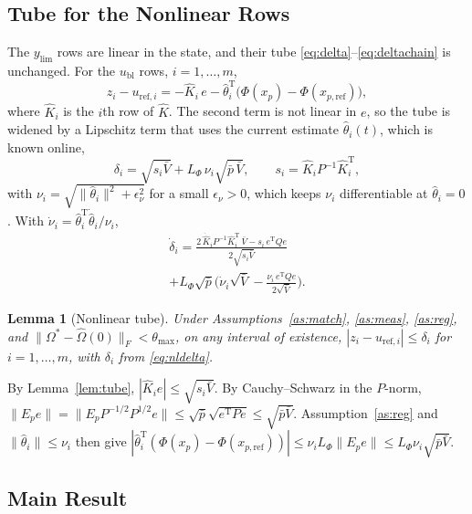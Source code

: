 \documentclass[lettersize,journal]{IEEEtran}
\newtheorem{lemma}{Lemma}
\newcommand{\Kh}{\hat{K}}
\newcommand{\xpr}{x_{p,\mathrm{ref}}}
\newcommand{\ub}{u_{\mathrm{bl}}}
\newcommand{\ylim}{y_{\mathrm{lim}}}
\newcommand{\Vb}{\bar{V}}
\newcommand{\tmax}{\theta_{\max}}
\newcommand{\T}{\mathrm{T}}
\begin{document}
\subsection{Tube for the Nonlinear Rows}

The $\ylim$ rows are linear in the state, and their tube \eqref{eq:delta}--\eqref{eq:deltachain} is unchanged. For the $\ub$ rows, $i=1,\dots,m$,
\begin{equation*}
z_i-u_{\mathrm{ref},i} = -\Kh_i\,e - \hat\theta_i^\T\big(\Phi(x_p)-\Phi(\xpr)\big),
\end{equation*}
where $\Kh_i$ is the $i$th row of $\Kh$. The second term is not linear in $e$, so the tube is widened by a Lipschitz term that uses the current estimate $\hat\theta_i(t)$, which is known online,
\begin{equation}
\delta_i = \sqrt{s_i\Vb} + L_\Phi\,\nu_i\sqrt{\bar p\,\Vb},\qquad s_i=\Kh_iP^{-1}\Kh_i^\T, \label{eq:nldelta}
\end{equation}
with $\nu_i=\sqrt{\|\hat\theta_i\|^2+\epsilon_\nu^2}$ for a small $\epsilon_\nu>0$, which keeps $\nu_i$ differentiable at $\hat\theta_i=0$. With $\dot\nu_i=\hat\theta_i^\T\dot{\hat\theta}_i/\nu_i$,
\begin{multline}
\dot\delta_i = \frac{2\,\dot{\Kh}_iP^{-1}\Kh_i^\T\,\Vb - s_i\,e^\T Qe}{2\sqrt{s_i\Vb}} \\
+ L_\Phi\sqrt{\bar p}\Big(\dot\nu_i\sqrt{\Vb} - \frac{\nu_i\,e^\T Qe}{2\sqrt{\Vb}}\Big). \label{eq:nldeltadot}
\end{multline}

\begin{lemma}[Nonlinear tube] \label{lem:nltube}
Under Assumptions~\ref{as:match}, \ref{as:meas}, \ref{as:reg}, and $\|\Omega^*-\hat\Omega(0)\|_F<\tmax$, on any interval of existence, $|z_i-u_{\mathrm{ref},i}|\le\delta_i$ for $i=1,\dots,m$, with $\delta_i$ from \eqref{eq:nldelta}.
\end{lemma}
\begin{IEEEproof}
By Lemma~\ref{lem:tube}, $|\Kh_ie|\le\sqrt{s_i\Vb}$. By Cauchy--Schwarz in the $P$-norm, $\|E_pe\|=\|E_pP^{-1/2}P^{1/2}e\|\le\sqrt{\bar p}\sqrt{e^\T Pe}\le\sqrt{\bar p\Vb}$. Assumption~\ref{as:reg} and $\|\hat\theta_i\|\le\nu_i$ then give $|\hat\theta_i^\T(\Phi(x_p)-\Phi(\xpr))|\le\nu_iL_\Phi\|E_pe\|\le L_\Phi\nu_i\sqrt{\bar p\Vb}$.
\end{IEEEproof}

\subsection{Main Result}
\end{document}
